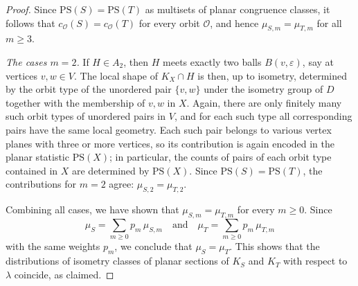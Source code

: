 \documentclass[10pt,a4paper]{amsart}
\begin{document}
\begin{proof}
Since $\mathrm{PS}(S) = \mathrm{PS}(T)$ as multisets of planar congruence
classes, it follows that $c_{\mathcal{O}}(S) = c_{\mathcal{O}}(T)$ for every
orbit $\mathcal{O}$, and hence $\mu_{S,m} = \mu_{T,m}$ for all $m \geq 3$.

\emph{The cases $m=2$.} If $H\in A_2$, then $H$ meets exactly two balls $B(v,\varepsilon)$, say at vertices
$v,w\in V$. The local shape of $K_X\cap H$ is then, up to isometry, determined by
the orbit type of the unordered pair $\{v,w\}$ under the isometry group of
$D$ together with the membership of $v,w$ in $X$. Again, there are only finitely many
such orbit types of unordered pairs in $V$, and for each such type all
corresponding pairs have the same local geometry. Each such pair belongs to various vertex planes with three or more vertices, so its contribution is again
encoded in the planar statistic $\mathrm{PS}(X)$; in particular, the counts of
pairs of each orbit type contained in $X$ are determined by $\mathrm{PS}(X)$.
Since $\mathrm{PS}(S)=\mathrm{PS}(T)$, the contributions for $m=2$ agree: $\mu_{S,2} = \mu_{T,2}$.

\medskip

Combining all cases, we have shown that $\mu_{S,m} = \mu_{T,m}$ for every $m\ge 0$. Since
\[
\mu_S = \sum_{m\ge 0} p_m\,\mu_{S,m}
\quad\text{and}\quad
\mu_T = \sum_{m\ge 0} p_m\,\mu_{T,m}
\]
with the same weights $p_m$, we conclude that $\mu_S=\mu_T$. This shows that the
distributions of isometry classes of planar sections of $K_S$ and $K_T$ with
respect to $\lambda$ coincide, as claimed.
\end{proof}
\end{document}
